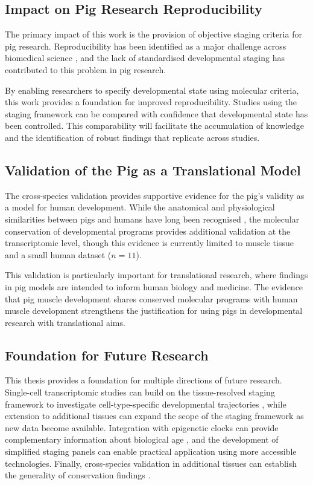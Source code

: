 \subsection{Impact on Pig Research Reproducibility}

The primary impact of this work is the provision of objective staging criteria for pig research. Reproducibility has been identified as a major challenge across biomedical science \parencite{baker_1500_2016}, and the lack of standardised developmental staging has contributed to this problem in pig research.

By enabling researchers to specify developmental state using molecular criteria, this work provides a foundation for improved reproducibility. Studies using the staging framework can be compared with confidence that developmental state has been controlled. This comparability will facilitate the accumulation of knowledge and the identification of robust findings that replicate across studies.

\subsection{Validation of the Pig as a Translational Model}

The cross-species validation provides supportive evidence for the pig's validity as a model for human development. While the anatomical and physiological similarities between pigs and humans have long been recognised \parencite{lelovas_comparative_2014, lunney_importance_2021}, the molecular conservation of developmental programs provides additional validation at the transcriptomic level, though this evidence is currently limited to muscle tissue and a small human dataset ($n = 11$).

This validation is particularly important for translational research, where findings in pig models are intended to inform human biology and medicine. The evidence that pig muscle development shares conserved molecular programs with human muscle development strengthens the justification for using pigs in developmental research with translational aims.

\subsection{Foundation for Future Research}

This thesis provides a foundation for multiple directions of future research. Single-cell transcriptomic studies can build on the tissue-resolved staging framework to investigate cell-type-specific developmental trajectories \parencite{schaum_single-cell_2018}, while extension to additional tissues can expand the scope of the staging framework as new data become available. Integration with epigenetic clocks can provide complementary information about biological age \parencite{teschendorff_epigenetic_2025}, and the development of simplified staging panels can enable practical application using more accessible technologies. Finally, cross-species validation in additional tissues can establish the generality of conservation findings \parencite{coorens_human_2025}.

